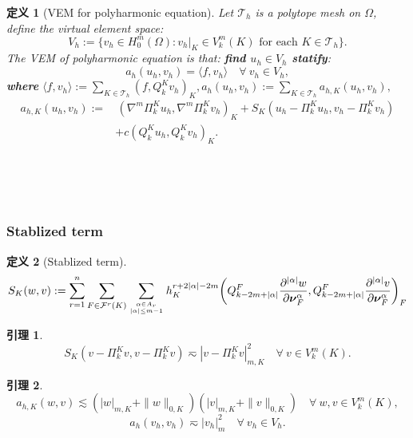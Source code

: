 \documentclass[notheorems,serif]{beamer}
\newcommand{\hei}[1]{{\HEI#1}}
\newtheorem{definition}{\hei{定义}}
\newtheorem{lemma}{\hei{引理}}
\begin{document}

\begin{frame}
\begin{definition}[VEM for polyharmonic equation]
  Let $\mathcal{T}_h$ is a polytope mesh on $\Omega$, 
  define the virtual element space:
  $$
  V_h:=\{v_h\in H_0^m(\Omega): v_h|_K\in V_{k}^{m}(K) \textrm{ for each } K\in\mathcal T_h\}.
  $$
  The VEM of polyharmonic equation is that: {\bf find $u_h \in V_h$ statify}: 
  $$
  a_{h}(u_h, v_h)=\langle f, v_h\rangle\quad\forall~v_h\in V_h,
  $$
  {\bf where} $\langle f, v_h\rangle:=\sum\limits_{K\in\mathcal T_h}(f,
  Q_k^Kv_h)_K, a_h(u_h, v_h):=\sum_{K\in\mathcal T_h}a_{h,K}(u_h, v_h),$
  $$
  \begin{aligned}
  a_{h,K}(u_h, v_h):=&\,(\nabla^m\Pi_k^Ku_h,
  \nabla^m\Pi_k^Kv_h)_K+S_K(u_h-\Pi_k^Ku_h,v_h-\Pi_k^Kv_h) \\
  &+c(Q_k^Ku_h, Q_k^Kv_h)_K.
  \end{aligned}
  $$
\end{definition}
\hspace*{\fill} \\
\hspace*{\fill} \\
\hspace*{\fill} \\
\end{frame}

\begin{frame}
  \frametitle{Stablized term}
  \begin{definition}[Stablized term]
    \footnotesize{
    $$
    S_K(w,v):=\sum_{r=1}^{n}\sum_{F\in\mathcal F^{r}(K)}\sum_{\alpha\in A_{r}\atop
    |\alpha|\leq
    m-1}h_K^{r+2|\alpha|-2m}\bigg(Q_{k-2m+|\alpha|}^{F}\frac{\partial^{|\alpha|}w}{\partial
    \boldsymbol{\nu}_{F}^{\alpha}},Q_{k-2m+|\alpha|}^{F}\frac{\partial^{|\alpha|}v}{\partial
    \boldsymbol{\nu}_{F}^{\alpha}}\bigg)_{F}
    $$
  }
  \end{definition}
  \begin{lemma}
      $$
      S_K(v-\Pi_k^Kv,v-\Pi_k^Kv)\eqsim |v-\Pi_k^Kv|_{m,K}^2\quad\forall~v\in V_{k}^{m}(K).
      $$
  \end{lemma}
    \begin{lemma}
    $$
    a_{h,K}(w, v)\lesssim (|w|_{m,K}+\|w\|_{0,K})(|v|_{m,K}+\|v\|_{0,K})\quad\forall~w,v\in V_{k}^{m}(K),
    $$
    $$
    a_{h}(v_h, v_h)\eqsim |v_h|_{m}^2\quad\forall~v_h\in V_h.   
    $$
    \end{lemma}
\end{frame}
\end{document}
